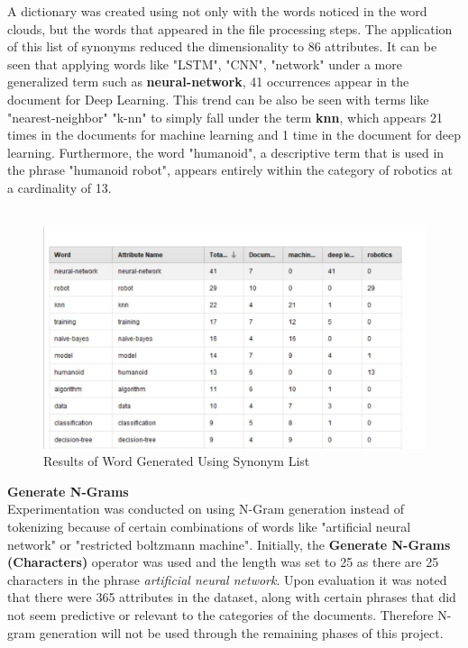 A dictionary was created using not only with the words noticed in the word clouds, but the words that appeared in the file processing steps. The application of this list of synonyms reduced the dimensionality to 86 attributes. It can be seen that applying words like "LSTM", "CNN", "network" under a more generalized term such as \textbf{neural-network}, 41 occurrences appear in the document for Deep Learning. 
This trend can be also be seen with terms like "nearest-neighbor" "k-nn" to simply fall under the term \textbf{knn}, which appears 21 times in the documents for machine learning and 1 time in the document for deep learning.
Furthermore, the word "humanoid", a descriptive term that is used in the phrase "humanoid robot", appears entirely within the category of robotics at a cardinality of 13. \\ \\
\begin{figure}[ht]
	\begin{center}
		\advance\leftskip-3cm
		\advance\rightskip-3cm
		\includegraphics[keepaspectratio=true,scale=0.8]{__resources/1.JPG}
		\caption{Results of Word Generated Using Synonym List}
		\label{stop}
	\end{center}
\end{figure} 
\newpage 

\textbf{Generate N-Grams}\\
Experimentation was conducted on using N-Gram generation instead of tokenizing because of certain combinations of words like "artificial neural network" or "restricted boltzmann machine". Initially, the \textbf{Generate N-Grams (Characters)} operator was used and the length was set to 25 as there are 25 characters in the phrase \textit{artificial neural network}. Upon evaluation it was noted that there were 365 attributes in the dataset, along with certain phrases that did not seem predictive or relevant to the categories of the documents. Therefore N-gram generation will not be used through the remaining phases of this project.



